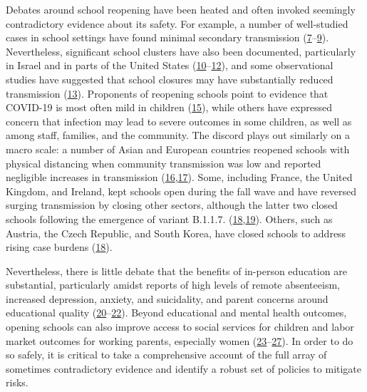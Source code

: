 \documentclass[
]{article}
\begin{document}
Debates around school reopening have been heated and often invoked
seemingly contradictory evidence about its safety. For example, a number
of well-studied cases in school settings have found minimal secondary
transmission
(\protect\hyperlink{ref-macartney_transmission_2020}{7}--\protect\hyperlink{ref-yung_novel_nodate}{9}).
Nevertheless, significant school clusters have also been documented,
particularly in Israel and in parts of the United States
(\protect\hyperlink{ref-stein-zamir_large_2020}{10}--\protect\hyperlink{ref-torres_sars-cov-2_nodate}{12}),
and some observational studies have suggested that school closures may
have substantially reduced transmission
(\protect\hyperlink{ref-auger_association_2020}{13}). Proponents of
reopening schools point to evidence that COVID-19 is most often mild in
children (\protect\hyperlink{ref-dong_epidemiology_2020}{15}), while
others have expressed concern that infection may lead to severe outcomes
in some children, as well as among staff, families, and the community.
The discord plays out similarly on a macro scale: a number of Asian and
European countries reopened schools with physical distancing when
community transmission was low and reported negligible increases in
transmission
(\protect\hyperlink{ref-noauthor_reopening_2020}{16},\protect\hyperlink{ref-pancevski_is_2020}{17}).
Some, including France, the United Kingdom, and Ireland, kept schools
open during the fall wave and have reversed surging transmission by
closing other sectors, although the latter two closed schools following
the emergence of variant B.1.1.7.
(\protect\hyperlink{ref-vogel_as_2020}{18},\protect\hyperlink{ref-staton_european_2021}{19}).
Others, such as Austria, the Czech Republic, and South Korea, have
closed schools to address rising case burdens
(\protect\hyperlink{ref-vogel_as_2020}{18}).

Nevertheless, there is little debate that the benefits of in-person
education are substantial, particularly amidst reports of high levels of
remote absenteeism, increased depression, anxiety, and suicidality, and
parent concerns around educational quality
(\protect\hyperlink{ref-polikoff_surveys_2020}{20}--\protect\hyperlink{ref-leeb_mental_2020}{22}).
Beyond educational and mental health outcomes, opening schools can also
improve access to social services for children and labor market outcomes
for working parents, especially women
(\protect\hyperlink{ref-hess_widespread_2020}{23}--\protect\hyperlink{ref-soland_impact_2020}{27}).
In order to do so safely, it is critical to take a comprehensive account
of the full array of sometimes contradictory evidence and identify a
robust set of policies to mitigate risks.
\end{document}
